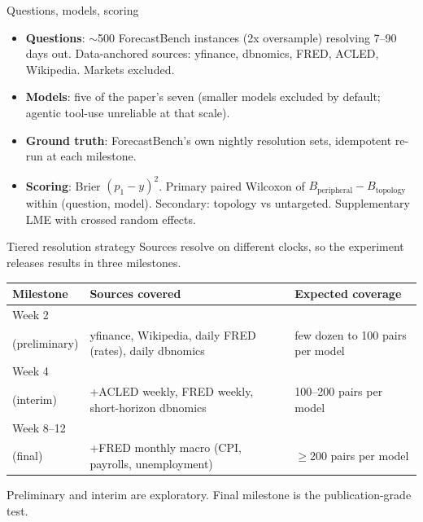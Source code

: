 \documentclass[aspectratio=169]{beamer}
\begin{document}
\begin{frame}{Questions, models, scoring}
\begin{itemize}
  \item \textbf{Questions}: $\sim$500 ForecastBench instances (2x oversample) resolving 7--90 days out. Data-anchored sources: yfinance, dbnomics, FRED, ACLED, Wikipedia. Markets excluded.
  \item \textbf{Models}: five of the paper's seven (smaller models excluded by default; agentic tool-use unreliable at that scale).
  \item \textbf{Ground truth}: ForecastBench's own nightly resolution sets, idempotent re-run at each milestone.
  \item \textbf{Scoring}: Brier $(p_1 - y)^2$. Primary paired Wilcoxon of $B_{\text{peripheral}} - B_{\text{topology}}$ within (question, model). Secondary: topology vs untargeted. Supplementary LME with crossed random effects.
\end{itemize}
\end{frame}

\begin{frame}{Tiered resolution strategy}
Sources resolve on different clocks, so the experiment releases results in three milestones.

\vspace{0.4em}
\begin{tabular}{@{}p{2.2cm}p{5.5cm}p{4cm}@{}}
\toprule
\textbf{Milestone} & \textbf{Sources covered} & \textbf{Expected coverage} \\
\midrule
Week 2 \\ (preliminary) & yfinance, Wikipedia, daily FRED (rates), daily dbnomics & few dozen to 100 pairs per model \\
\addlinespace
Week 4 \\ (interim) & +ACLED weekly, FRED weekly, short-horizon dbnomics & 100--200 pairs per model \\
\addlinespace
Week 8--12 \\ (final) & +FRED monthly macro (CPI, payrolls, unemployment) & $\geq$200 pairs per model \\
\bottomrule
\end{tabular}

\vspace{0.5em}
\small Preliminary and interim are exploratory. Final milestone is the publication-grade test.
\end{frame}
\end{document}

